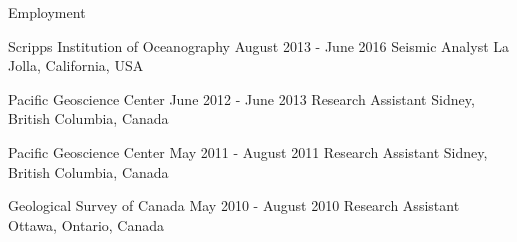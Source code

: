 \begin{rSection}{Employment}
    \begin{rSubsection}
        {Scripps Institution of Oceanography}
        {August 2013 - June 2016}
        {Seismic Analyst}
        {La Jolla, California, USA}
    \end{rSubsection}
    \begin{rSubsection}
        {Pacific Geoscience Center}
        {June 2012 - June 2013}
        {Research Assistant}
        {Sidney, British Columbia, Canada}
    \end{rSubsection}
    \begin{rSubsection}
        {Pacific Geoscience Center}
        {May 2011 - August 2011}
        {Research Assistant}
        {Sidney, British Columbia, Canada}
    \end{rSubsection}
    \begin{rSubsection}
        {Geological Survey of Canada}
        {May 2010 - August 2010}
        {Research Assistant}
        {Ottawa, Ontario, Canada}
    \end{rSubsection}
\end{rSection}